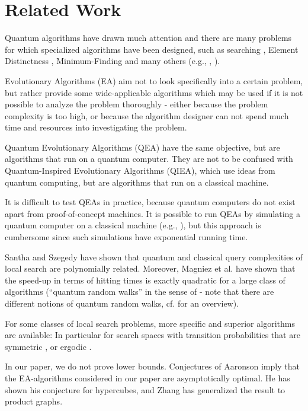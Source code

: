 

\section{Related Work}

Quantum algorithms have drawn much attention and there are many problems for which specialized algorithms have been designed, such as searching \cite{Grover96} \cite{BoyerBHT98}, Element Distinctness \cite{Santha08}, Minimum-Finding \cite{DurrH96} and many others (e.g., \cite{DurrHHM04} \cite{BerzinaDFLS04}, \cite{Zhangthesis06}).

Evolutionary Algorithms (EA) aim not to look specifically into a certain problem, but rather provide some wide-applicable algorithms which may be used if it is not possible to analyze the problem thoroughly - either because the problem complexity is too high, or because the algorithm designer can not spend much time and resources into investigating the problem.

Quantum Evolutionary Algorithms (QEA) have the same objective, but are algorithms that run on a quantum computer. They are not to be confused with Quantum-Inspired Evolutionary Algorithms (QIEA), which use ideas from quantum computing, but are algorithms that run on a classical machine.

It is difficult to test QEAs in practice, because quantum computers do not exist apart from proof-of-concept machines. It is possible to run QEAs by simulating a quantum computer on a classical machine (e.g., \cite{SpectorBBS99}), but this approach is cumbersome since such simulations have exponential running time.

Santha and Szegedy have shown \cite{SanthaS09} that quantum and classical query complexities of local search are polynomially related. Moreover, Magniez et al. have shown \cite{MagniezNRS09} that the speed-up in terms of hitting times is exactly quadratic for a large class of algorithms (``quantum random walks'' in the sense of \cite{Szegedy04} - note that there are different notions of quantum random walks, cf. \cite{MagniezNRS07} for an overview).

For some classes of local search problems, more specific and superior algorithms are available: In particular for search spaces with transition probabilities that are symmetric \cite{Szegedy04}, or ergodic \cite{MagniezNRS07}.

In our paper, we do not prove lower bounds. Conjectures of Aaronson \cite{Aaronson06} imply that the EA-algorithms considered in our paper are asymptotically optimal.  He has shown his conjecture for hypercubes, and Zhang \cite{Zhang06} has generalized the result to product graphs.


